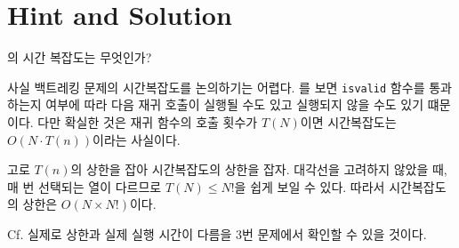 \chapter{Hint and Solution}

\begin{problem}
    의 시간 복잡도는 무엇인가?
\end{problem}

\begin{sol}
    사실 백트레킹 문제의 시간복잡도를 논의하기는 어렵다. 를 보면 \texttt{isvalid} 함수를 통과하는지 여부에 따라 다음 재귀 호출이 실행될 수도 있고 실행되지 않을 수도 있기 떄문이다. 다만 확실한 것은 재귀 함수의 호출 횟수가 $T(N)$이면 시간복잡도는 $O(N \cdot T(n))$이라는 사실이다.

    고로 $T(n)$의 상한을 잡아 시간복잡도의 상한을 잡자. 대각선을 고려하지 않았을 때, 매 번 선택되는 열이 다르므로 $T(N) \leq N!$을 쉽게 보일 수 있다. 따라서 시간복잡도의 상한은 $O(N \times N!)$이다.

    Cf. 실제로 상한과 실제 실행 시간이 다름을 3번 문제에서 확인할 수 있을 것이다.
\end{sol}